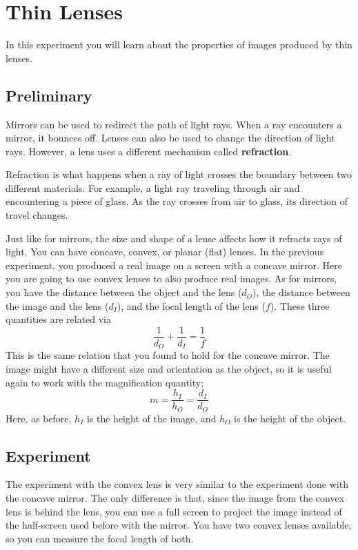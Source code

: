 \setcounter{chapter}{7}
\chapter{Thin Lenses}
In this experiment you will learn about the properties of images produced by thin lenses.
\section{Preliminary}
Mirrors can be used to redirect the path of light rays. When a ray encounters a mirror, it bounces off. Lenses can also be used to change the direction of light rays. However, a lens uses a different mechanism called \textbf{refraction}.

Refraction is what happens when a ray of light crosses the boundary between two different materials. For example, a light ray traveling through air and encountering a piece of glass. As the ray crosses from air to glass, its direction of travel changes.

Just like for mirrors, the size and shape of a lense affects how it refracts rays of light. You can have concave, convex, or planar (flat) lenses. In the previous experiment, you produced a real image on a screen with a concave mirror. Here you are going to use convex lenses to also produce real images. As for mirrors, you have the distance between the object and the lens ($d_{O}$), the distance between the image and the lens ($d_{I}$), and the focal length of the lens ($f$). These three quantities are related via
\begin{equation}
    \frac{1}{d_{O}} + \frac{1}{d_{I}} = \frac{1}{f}
\end{equation}
This is the same relation that you found to hold for the concave mirror. The image might have a different size and orientation as the object, so it is useful again to work with the magnification quantity:
\begin{equation}
    m = \frac{h_{I}}{h_{O}} = \frac{d_{I}}{d_{O}}
\end{equation}
Here, as before, $h_{I}$ is the height of the image, and $h_{O}$ is the height of the object.
\section{Experiment}
The experiment with the convex lens is very similar to the experiment done with the concave mirror. The only difference is that, since the image from the convex lens is behind the lens, you can use a full screen to project the image instead of the half-screen used before with the mirror. You have two convex lenses available, so you can measure the focal length of both.
